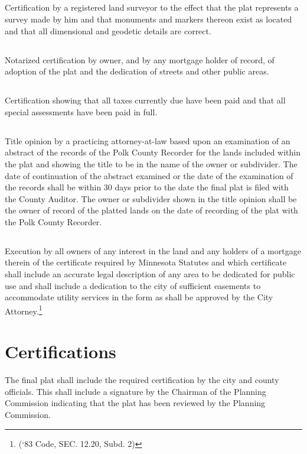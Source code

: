 \subsection{}
Certification by a registered land surveyor to the effect that the plat represents a survey made by him and that monuments and markers thereon exist as located and that all dimensional and geodetic details are correct.
\subsection{}
Notarized certification by owner, and by any mortgage holder of record, of adoption of the plat and the dedication of streets and other public areas.
\subsection{}
Certification showing that all taxes currently due have been paid and that all special assessments have been paid in full.
\subsection{}
Title opinion by a practicing attorney-at-law based upon an examination of an abstract of the records of the Polk County Recorder for the lands included within the plat and showing the title to be in the name of the owner or subdivider. The date of continuation of the abstract examined or the date of the examination of the records shall be within 30 days prior to the date the final plat is filed with the County Auditor. The owner or subdivider shown in the title opinion shall be the owner of record of the platted lands on the date of recording of the plat with the Polk County Recorder.
\subsection{}
Execution by all owners of any interest in the land and any holders of a mortgage therein of the certificate required by Minnesota Statutes and which certificate shall include an accurate legal description of any area to be dedicated for public use and shall include a dedication to the city of sufficient easements to accommodate utility services in the form as shall be approved by the City Attorney.\footnote{(‘83 Code, SEC. 12.20, Subd. 2)}
\section{Certifications}
The final plat shall include the required certification by the city and county officials. This shall include a signature by the Chairman of the Planning Commission indicating that the plat has been reviewed by the Planning Commission.
